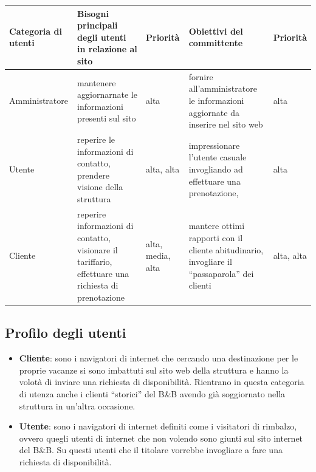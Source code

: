 \documentclass[a4paper,12pt,hidelinks]{report}
\begin{document}
\begin{center}
  \begin{tabular}{||m{3cm}||m{4cm}|m{}||m{4cm}|m{}||}
    \hline
      \textbf{Categoria di utenti} & \textbf{Bisogni principali degli utenti in relazione al sito} & Priorità & \textbf{Obiettivi del committente} & Priorità \\
    \hline
      Amministratore & mantenere aggiornarnate le informazioni presenti sul sito & alta & fornire all'amministratore le informazioni aggiornate da inserire nel sito web & alta\\
    \hline
      Utente & reperire le informazioni di contatto, prendere visione della struttura
	     & alta, alta
	     & impressionare l'utente casuale invogliando ad effettuare una prenotazione,  & alta\\
    \hline  
      Cliente & reperire informazioni di contatto, visionare il tariffario, effettuare una richiesta di prenotazione & alta, media, alta & mantere ottimi rapporti con
      il cliente abitudinario, invogliare il ``passaparola'' dei clienti & alta, alta\\
    \hline
  \end{tabular}
\end{center}
\subsection{Profilo degli utenti}
  \begin{itemize}
   \item \textbf{Cliente}: sono i navigatori di internet che cercando una destinazione per le proprie vacanze si sono imbattuti sul sito web della struttura e hanno la volotà di inviare 
   una richiesta di disponibilità. Rientrano in questa categoria di utenza anche i clienti ``storici'' del B\&B avendo già soggiornato nella struttura in un'altra occasione.
   \item \textbf{Utente}: sono i navigatori di internet definiti come i visitatori di rimbalzo, ovvero quegli utenti di internet che non volendo sono giunti sul sito internet del B\&B. 
   Su questi utenti che il titolare vorrebbe invogliare a fare una richiesta di disponibilità.
   \end{itemize}
\end{document}
